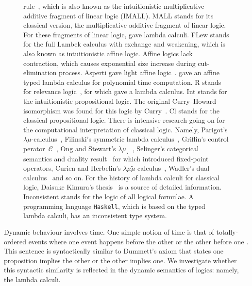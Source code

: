 \begin{figure}
{  rule~\citep[p.86]{residuated}, which is also known as the
  intuitionistic
  multiplicative additive fragment of linear logic (IMALL).
  \textsf{MALL} stands for its classical version, the multiplicative
  additive fragment of linear logic.  For these fragments of linear
  logic,
  \citet{abramsky1993computational} gave lambda calculi.
  \textsf{FLew} stands for the full Lambek calculus with exchange and
  weakening,
  which is also known as intuitionistic affine logic.
  Affine logics lack contraction, which causes exponential size increase
  during cut-elimination process.
  Asperti gave light affine logic~\citep{2002}.
  \citet{terui2007} gave an affine typed lambda calculus for polynomial
  time computation.
  \textsf{R} stands for relevance logic~\citep{urquhart1972},
  for which \citet{gabbay1992} gave a lambda calculus.
  \textsf{Int} stands for the intuitionistic propositional logic.
  The original Curry--Howard isomorphism was found for this logic by
  Curry~\citep{curry1942}.
  \textsf{Cl} stands for the classical propositional logic.
  There is intensive research going on for the computational
  interpretation of classical logic.  Namely,
  Parigot's $\lambda\mu$-calculus~\citep{lambdamu},
  Filinski's symmetric lambda calculus~\citep{filinski1989},
  Griffin's control perator~$\mathcal C$~\citep{griffin1990},
  Ong and Stewart's $\lambda\mu_{\mathrm
  v}$~\citep{ong-stewart},
  Selinger's categorical semantics and duality
  result~\citep{selinger2001} for which \citet{kakutani2002} introduced
  fixed-point
  operators,
  Curien and Herbelin's $\bar\lambda\mu\tilde\mu$
  calculus~\citep{curien2000},
  Wadler's dual calculus~\citep{wadler-dual, wadler-reloaded} and so on.
  For the history of lambda calculi for classical logic,
  Daisuke Kimura's thesis~\cite{kimura} is a source of detailed
  information.
  \textsf{Inconsistent} stands for the logic of all logical formulae.
  A programming language \texttt{Haskell}, which is based on
  the typed lambda calculi, has
  an inconsistent type system.
  }
  \label{fig:lattice}
 \end{figure}
Dynamic behaviour involves time.
One simple notion of time is that of totally-ordered events where
one event happens before the other or the other before one .
This sentence is syntactically similar to Dummett's axiom that states
one proposition implies the other or the other implies one.
We investigate whether this syntactic similarity is reflected
in the dynamic semantics of logics: namely, the lambda calculi.

